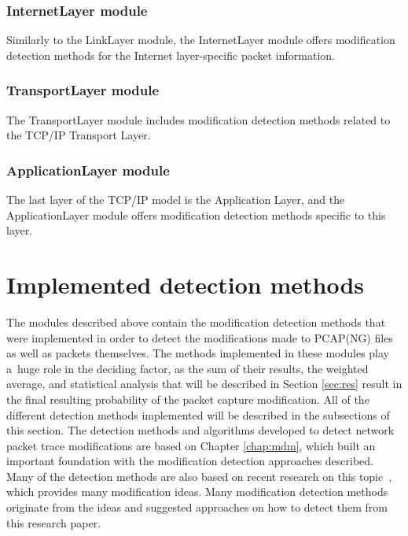 \documentclass[
  printed,     %
  color,       %
  oneside,     %
  nosansbold,  %
  nocolorbold, %
  nolof,         %
  nolot,         %
]{fithesis4}
\begin{document}
\subsubsection{InternetLayer module}

Similarly to the LinkLayer module, the InternetLayer module offers modification detection methods for the Internet layer-specific packet information.

\subsubsection{TransportLayer module}

The TransportLayer module includes modification detection methods related to the TCP/IP Transport Layer.

\subsubsection{ApplicationLayer module}

The last layer of the TCP/IP model is the Application Layer, and the ApplicationLayer module offers modification detection methods specific to this layer.


\section{Implemented detection methods}

The modules described above contain the modification detection methods that were implemented in order to detect the modifications made to PCAP(NG) files as well as packets themselves. The methods implemented in these modules play a~huge role in the deciding factor, as the sum of their results, the weighted average, and statistical analysis that will be described in Section \ref{sec:res} result in the final resulting probability of the packet capture modification. All of the different detection methods implemented will be described in the subsections of this section. The detection methods and algorithms developed to detect network packet trace modifications are based on Chapter \ref{chap:mdm}, which built an important foundation with the modification detection approaches described. Many of the detection methods are also based on recent research on this topic~\cite{Howcanne5:online}, which provides many modification ideas. Many modification detection methods originate from the ideas and suggested approaches on how to detect them from this research paper.
\end{document}
